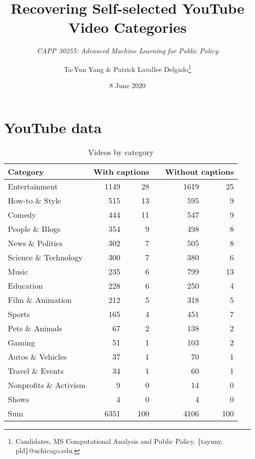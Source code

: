 \documentclass[letterpaper, 12pt]{article}
\title{Recovering Self-selected YouTube Video Categories}
\subtitle{\textit{CAPP 30255: Advanced Machine Learning for Public Policy}}
\author{Ta-Yun Yang \& Patrick Lavallee Delgado\thanks{Candidates, MS Computational Analysis and Public Policy, \{tayuny, pld\}@uchicago.edu.}}
\date{8 June 2020}
\begin{document}
\maketitle

\section{YouTube data}

\begin{table}[H]
  \centering
  \caption*{Videos by category}
  \begin{tabular}{lrr@{\%}p{1em}rr@{\%}}
    \toprule
    Category & \multicolumn{2}{l}{\enspace With captions \enspace} & & \multicolumn{2}{l}{Without captions} \\
    \midrule
    Entertainment           & 1149  & 28  & & 1619  & 25 \\
    How-to \& Style         & 515   & 13  & & 595   & 9  \\
    Comedy                  & 444   & 11  & & 547   & 9  \\
    People \& Blogs         & 354   & 9   & & 498   & 8  \\
    News \& Politics        & 302   & 7   & & 505   & 8  \\
    Science \& Technology   & 300   & 7   & & 380   & 6  \\
    Music                   & 235   & 6   & & 799   & 13 \\
    Education               & 228   & 6   & & 250   & 4  \\ 
    Film \& Animation       & 212   & 5   & & 318   & 5  \\
    Sports                  & 165   & 4   & & 451   & 7  \\
    \hline
    Pets \& Animals         & 67    & 2   & & 138   & 2  \\
    Gaming                  & 51    & 1   & & 103   & 2  \\
    Autos \& Vehicles       & 37    & 1   & & 70    & 1  \\
    Travel \& Events        & 34    & 1   & & 60    & 1  \\
    Nonprofits \& Activism  & 9     & 0   & & 14    & 0  \\
    Shows                   & 4     & 0   & & 4     & 0  \\
    \bottomrule
    Sum                     & 6351  & 100 & & 4106  & 100 \\
  \end{tabular}
\end{table}
\end{document}
